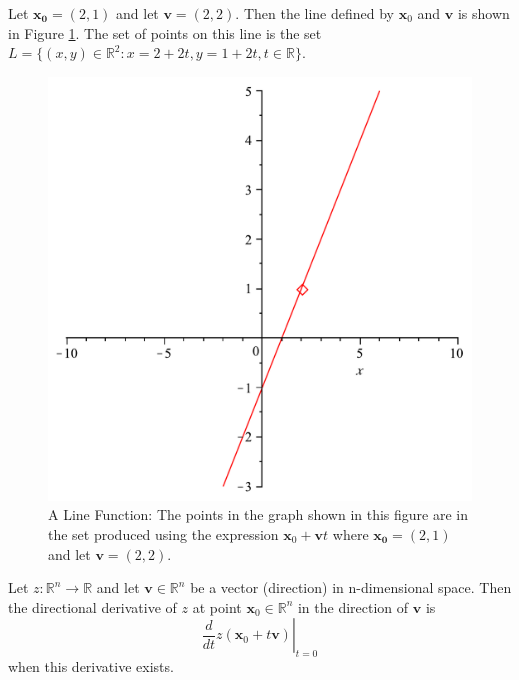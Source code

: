 \begin{example}
Let $\mathbf{x_0} = (2,1)$ and let $\mathbf{v} = (2,2)$. Then the line defined by $\mathbf{x}_0$ and $\mathbf{v}$ is shown in Figure \ref{fig:LineExample}. The set of points on this line is the set $L = \{(x,y) \in \mathbb{R}^2 : x = 2 + 2t, y = 1 + 2t, t \in \mathbb{R}\}$. 
\begin{figure}[ht]
\centering
\includegraphics[scale=0.25]{LinePlot.pdf}
\caption{A Line Function: The points in the graph shown in this figure are in the set produced using the expression $\mathbf{x}_0 + \mathbf{v}t$ where $\mathbf{x_0} = (2,1)$ and let $\mathbf{v} = (2,2)$.}
\label{fig:LineExample}
\end{figure}
\label{ex:BasicLine}
\end{example}

\begin{definition} Let $z:\mathbb{R}^n \rightarrow \mathbb{R}$ and let $\mathbf{v} \in \mathbb{R}^n$ be a vector (direction) in n-dimensional space. Then the directional derivative of $z$ at point $\mathbf{x}_0 \in\mathbb{R}^n$ in the direction of $\mathbf{v}$ is
\begin{equation}
\left.\frac{d}{dt}z(\mathbf{x}_0 + t\mathbf{v})\right\vert_{t=0}
\end{equation}
when this derivative exists.
\label{def:DirectionalDerivative}
\end{definition}

